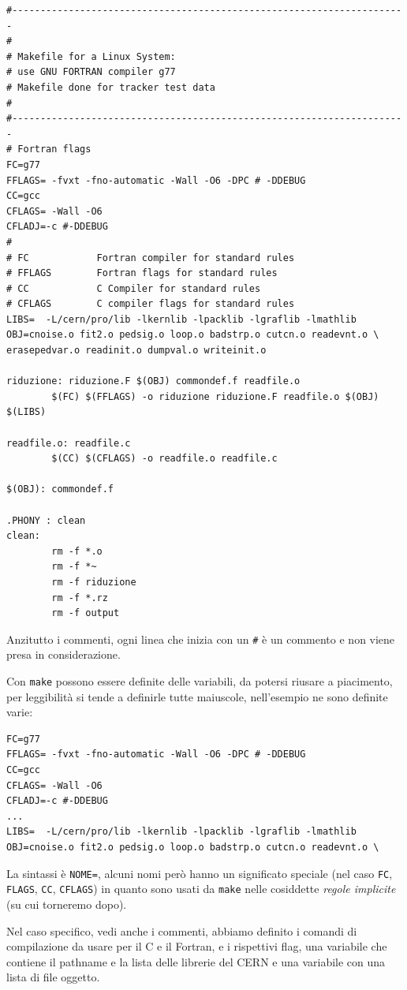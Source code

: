\small
\begin{verbatim}
#----------------------------------------------------------------------
#
# Makefile for a Linux System:
# use GNU FORTRAN compiler g77
# Makefile done for tracker test data
#
#----------------------------------------------------------------------
# Fortran flags
FC=g77
FFLAGS= -fvxt -fno-automatic -Wall -O6 -DPC # -DDEBUG
CC=gcc
CFLAGS= -Wall -O6
CFLADJ=-c #-DDEBUG
#
# FC            Fortran compiler for standard rules
# FFLAGS        Fortran flags for standard rules
# CC            C Compiler for standard rules
# CFLAGS        C compiler flags for standard rules 
LIBS=  -L/cern/pro/lib -lkernlib -lpacklib -lgraflib -lmathlib
OBJ=cnoise.o fit2.o pedsig.o loop.o badstrp.o cutcn.o readevnt.o \
erasepedvar.o readinit.o dumpval.o writeinit.o

riduzione: riduzione.F $(OBJ) commondef.f readfile.o
        $(FC) $(FFLAGS) -o riduzione riduzione.F readfile.o $(OBJ) $(LIBS) 

readfile.o: readfile.c
        $(CC) $(CFLAGS) -o readfile.o readfile.c

$(OBJ): commondef.f

.PHONY : clean
clean:
        rm -f *.o 
        rm -f *~
        rm -f riduzione
        rm -f *.rz
        rm -f output
\end{verbatim}
\normalsize

Anzitutto i commenti, ogni linea che inizia con un \texttt{\#} è un
commento e non viene presa in considerazione.

Con \texttt{make} possono essere definite delle variabili, da potersi riusare
a piacimento, per leggibilità si tende a definirle tutte maiuscole,
nell'esempio ne sono definite varie: \small
\begin{verbatim}
FC=g77
FFLAGS= -fvxt -fno-automatic -Wall -O6 -DPC # -DDEBUG
CC=gcc
CFLAGS= -Wall -O6
CFLADJ=-c #-DDEBUG
...
LIBS=  -L/cern/pro/lib -lkernlib -lpacklib -lgraflib -lmathlib
OBJ=cnoise.o fit2.o pedsig.o loop.o badstrp.o cutcn.o readevnt.o \
\end{verbatim}
\normalsize

La sintassi è \texttt{NOME=}, alcuni nomi però hanno un significato speciale
(nel caso \texttt{FC}, \texttt{FLAGS}, \texttt{CC}, \texttt{CFLAGS}) in quanto
sono usati da \texttt{make} nelle cosiddette \textsl{regole implicite} (su cui
torneremo dopo).

Nel caso specifico, vedi anche i commenti, abbiamo definito i comandi di 
compilazione da usare per il C e il Fortran, e i rispettivi flag, una variabile
che contiene il pathname e la lista delle librerie del CERN e una variabile con una
lista di file oggetto.

